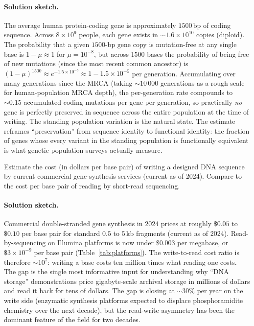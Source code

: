 \paragraph{Solution sketch.} The average human protein-coding gene
is approximately $1500\,\text{bp}$ of coding sequence. Across $8
\times 10^9$ people, each gene exists in $\sim 1.6 \times 10^{10}$
copies (diploid). The probability that a given $1500$-bp gene copy
is mutation-free at any single base is $1 - \mu \approx 1$ for
$\mu = 10^{-8}$, but across $1500$ bases the probability of being
free of new mutations (since the most recent common ancestor) is
$(1 - \mu)^{1500} \approx e^{-1.5 \times 10^{-5}} \approx 1 - 1.5
\times 10^{-5}$ per generation. Accumulating over many generations
since the MRCA (taking $\sim 10\,000$ generations as a rough scale
for human-population MRCA depth), the per-generation rate compounds
to $\sim 0.15$ accumulated coding mutations per gene per generation,
so practically \emph{no} gene is perfectly preserved in sequence
across the entire population at the time of writing. The standing
population variation is the natural state. The estimate reframes
``preservation'' from sequence identity to functional identity: the
fraction of genes whose every variant in the standing population is
functionally equivalent is what genetic-population surveys actually
measure.

\begin{exercise}
Estimate the cost (in dollars per base pair) of writing a designed
DNA sequence by current commercial gene-synthesis services (current
as of 2024). Compare to the cost per base pair of reading by
short-read sequencing.
\end{exercise}

\paragraph{Solution sketch.} Commercial double-stranded gene synthesis
in 2024 prices at roughly $\$0.05$ to $\$0.10$ per base pair for
standard $0.5$ to $5\,\text{kb}$ fragments (current as of 2024).
Read-by-sequencing on Illumina platforms is now under $\$0.003$ per
megabase, or $\$3 \times 10^{-9}$ per base pair (Table~\ref{tab:platforms}).
The write-to-read cost ratio is therefore $\sim 10^7$: writing a base
costs ten million times what reading one costs. The gap is the
single most informative input for understanding why ``DNA storage''
demonstrations price gigabyte-scale archival storage in millions of
dollars and read it back for tens of dollars. The gap is closing at
$\sim 30\%$ per year on the write side (enzymatic synthesis platforms
expected to displace phosphoramidite chemistry over the next decade),
but the read-write asymmetry has been the dominant feature of the
field for two decades.

